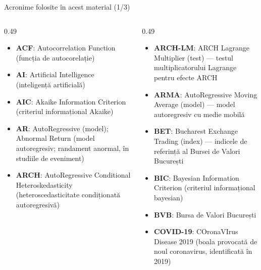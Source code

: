 {
\begin{frame}[noframenumbering]
    \titlepage
\end{frame}
}
\begin{frame}{Acronime folosite în acest material (1/3)}
\begin{columns}[T]
\begin{column}{0.49\textwidth}
\begin{itemize}\setlength{\itemsep}{0pt}
    \item \textbf{ACF}: Autocorrelation Function (funcția de autocorelație)
    \item \textbf{AI}: Artificial Intelligence (inteligență artificială)
    \item \textbf{AIC}: Akaike Information Criterion (criteriul informațional Akaike)
    \item \textbf{AR}: AutoRegressive (model); Abnormal Return (model autoregresiv; randament anormal, în studiile de eveniment)
    \item \textbf{ARCH}: AutoRegressive Conditional Heteroskedasticity (heteroscedasticitate condiționată autoregresivă)
\end{itemize}
\end{column}
\begin{column}{0.49\textwidth}
\begin{itemize}\setlength{\itemsep}{0pt}
    \item \textbf{ARCH-LM}: ARCH Lagrange Multiplier (test) — testul multiplicatorului Lagrange pentru efecte ARCH
    \item \textbf{ARMA}: AutoRegressive Moving Average (model) — model autoregresiv cu medie mobilă
    \item \textbf{BET}: Bucharest Exchange Trading (index) — indicele de referință al Bursei de Valori București
    \item \textbf{BIC}: Bayesian Information Criterion (criteriul informațional bayesian)
    \item \textbf{BVB}: Bursa de Valori București
    \item \textbf{COVID-19}: COronaVIrus Disease 2019 (boala provocată de noul coronavirus, identificată în 2019)
\end{itemize}
\end{column}
\end{columns}
\end{frame}
